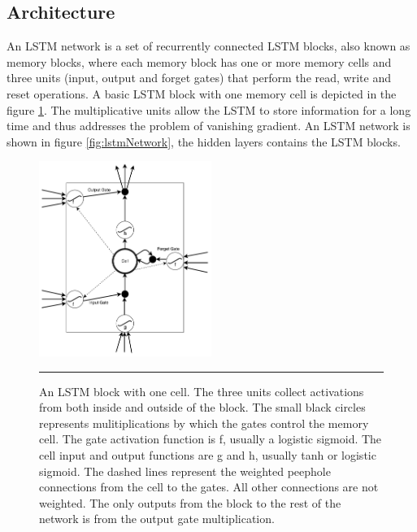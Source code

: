 \subsection{Architecture}
An LSTM network is a set of recurrently connected LSTM blocks, also known as memory blocks, where
each memory block has one or more memory cells and three units (input, output and forget gates)
that perform the read, write and reset operations. A basic LSTM block with one memory cell is
depicted in the figure \ref{fig:lstmBlock}. The multiplicative units allow the LSTM to store
information for a long time and thus addresses the problem of vanishing gradient. An LSTM network
is shown in figure \ref{fig:lstmNetwork}, the hidden layers contains the LSTM blocks.

\begin{figure}[htbp]
  \centering
    \includegraphics[width=0.5\textwidth,height=0.5\textheight,keepaspectratio]{Figures/lstm-block.pdf}
    \rule{35em}{0.5pt}
  \caption[An LSTM block with one cell]
{An LSTM block with one cell. The three units collect activations from both inside and outside of
the block. The small black circles represents mulitiplications by which the gates control the
memory cell. The gate activation function is f, usually a logistic sigmoid. The cell input and
output functions are g and h, usually tanh or logistic sigmoid. The dashed lines represent the
weighted peephole connections from the cell to the gates. All other connections are not weighted.
The only outputs from the block to the rest of the network is from the output gate multiplication.}
  \label{fig:lstmBlock}
\end{figure}

